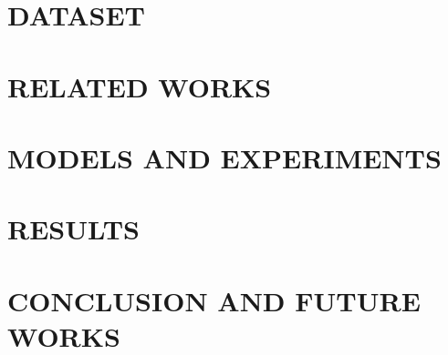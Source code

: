 \documentclass[BTech]{iitddiss}
\begin{document}
\chapter{DATASET}
\label{chap:dataset}


\chapter{RELATED WORKS}
\label{chap:related-works}


\chapter{MODELS AND EXPERIMENTS}
\label{chap:models}


% 

\chapter{RESULTS}
\label{chap:results}


\chapter{CONCLUSION AND FUTURE WORKS}
\label{chap:future-works}









\appendix

% 
\end{document}
